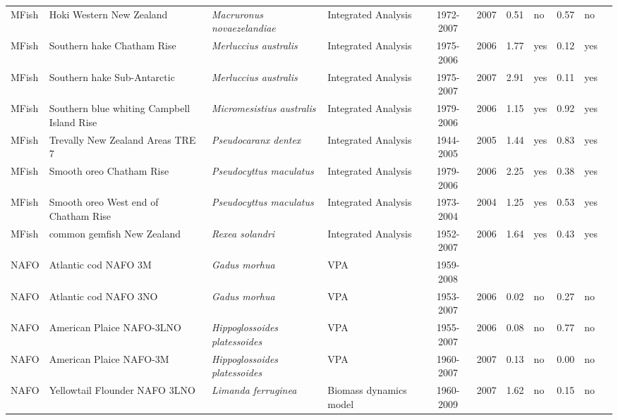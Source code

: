 \begin{longtable}{p{1.8cm}p{3.5cm}p{3.5cm}p{3cm}cccp{0.9cm}cp{0.9cm}c}
  MFish & Hoki Western New Zealand & \textit{Macruronus novaezelandiae} & Integrated Analysis & 1972-2007 & 2007 & 0.51 & no & 0.57 & no & \cite{FAR0804hok07.pdf} \\ 
  MFish & Southern hake Chatham Rise & \textit{Merluccius australis} & Integrated Analysis & 1975-2006 & 2006 & 1.77 & yes & 0.12 & yes & \cite{CORDUEperscomm.pdf} \\ 
  MFish & Southern hake Sub-Antarctic & \textit{Merluccius australis} & Integrated Analysis & 1975-2007 & 2007 & 2.91 & yes & 0.11 & yes & \cite{CORDUEperscomm.pdf} \\ 
  MFish & Southern blue whiting Campbell Island Rise & \textit{Micromesistius australis} & Integrated Analysis & 1979-2006 & 2006 & 1.15 & yes & 0.92 & yes & \cite{CORDUEperscomm.pdf} \\ 
  MFish & Trevally New Zealand Areas TRE 7 & \textit{Pseudocaranx dentex} & Integrated Analysis & 1944-2005 & 2005 & 1.44 & yes & 0.83 & yes & \cite{CORDUEperscomm.pdf} \\ 
  MFish & Smooth oreo Chatham Rise & \textit{Pseudocyttus maculatus} & Integrated Analysis & 1979-2006 & 2006 & 2.25 & yes & 0.38 & yes & \cite{CORDUEperscomm.pdf} \\ 
  MFish & Smooth oreo West end of Chatham Rise & \textit{Pseudocyttus maculatus} & Integrated Analysis & 1973-2004 & 2004 & 1.25 & yes & 0.53 & yes & \cite{CORDUEperscomm.pdf} \\ 
  MFish & common gemfish New Zealand & \textit{Rexea solandri} & Integrated Analysis & 1952-2007 & 2006 & 1.64 & yes & 0.43 & yes & \cite{CORDUEperscomm.pdf} \\ 
  NAFO & Atlantic cod NAFO 3M & \textit{Gadus morhua} & VPA & 1959-2008 &  &  &  &  &  & \cite{NAFO-3M-COD-2008.pdf} \\ 
  NAFO & Atlantic cod NAFO 3NO & \textit{Gadus morhua} & VPA & 1953-2007 & 2006 & 0.02 & no & 0.27 & no & \cite{NAFO-3NO-COD-2007.pdf} \\ 
  NAFO & American Plaice NAFO-3LNO & \textit{Hippoglossoides platessoides} & VPA & 1955-2007 & 2006 & 0.08 & no & 0.77 & no & \cite{NAFO-GrandBanks-AmPlaice-2007.pdf} \\ 
  NAFO & American Plaice NAFO-3M & \textit{Hippoglossoides platessoides} & VPA & 1960-2007 & 2007 & 0.13 & no & 0.00 & no & \cite{NAFO-AMPL3M-2008.pdf} \\ 
  NAFO & Yellowtail Flounder NAFO 3LNO & \textit{Limanda ferruginea} & Biomass dynamics model & 1960-2009 & 2007 & 1.62 & no & 0.15 & no & \cite{NAFO-YELL3LNO-2008.pdf} \\ 

\end{longtable}
